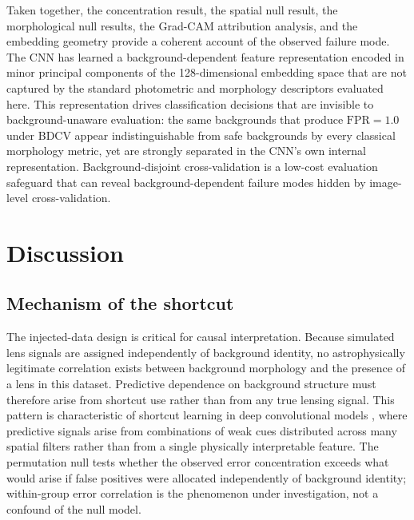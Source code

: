 \documentclass[fleqn,usenatbib]{mnras}
\begin{document}
Taken together, the concentration result, the spatial null result, the
morphological null results, the Grad-CAM attribution analysis, and the
embedding geometry provide a coherent account of the observed failure
mode. The CNN has learned a
background-dependent feature representation encoded in minor principal
components of the 128-dimensional embedding space that are not captured
by the standard photometric and morphology descriptors evaluated here.
This representation drives classification decisions that are invisible
to background-unaware evaluation: the same backgrounds that produce
$\mathrm{FPR} = 1.0$ under BDCV appear indistinguishable from safe
backgrounds by every classical morphology metric, yet are strongly
separated in the CNN's own internal representation. Background-disjoint
cross-validation is a low-cost evaluation safeguard that can reveal
background-dependent failure modes hidden by image-level cross-validation.

\section{Discussion}
\label{sec:discussion}

\subsection{Mechanism of the shortcut}
\label{sec:mechanism}

The injected-data design is critical for causal interpretation. Because
simulated lens signals are assigned independently of background identity,
no astrophysically legitimate correlation exists between background
morphology and the presence of a lens in this dataset. Predictive
dependence on background structure must therefore arise from shortcut use
rather than from any true lensing signal. This pattern is characteristic
of shortcut learning in deep convolutional models \citep{geirhos2020},
where predictive signals arise from combinations of weak cues distributed
across many spatial filters rather than from a single physically
interpretable feature. The permutation null tests whether the observed
error concentration exceeds what would arise if false positives were
allocated independently of background identity; within-group error
correlation is the phenomenon under investigation, not a confound of the
null model.
\end{document}
